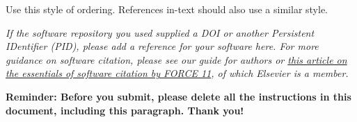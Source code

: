 \documentclass[preprint,12pt, a4paper]{elsarticle}
\begin{document}

\begin{thebibliography}{00}


\bibitem{} Use this style of ordering. References in-text should also use a similar style.

\end{thebibliography}

\textit{If the software repository you used supplied a DOI or another
Persistent IDentifier (PID), please add a reference for your software
here. For more guidance on software citation, please see our guide for
authors or \href{https://f1000research.com/articles/9-1257/v2}{this
  article on the essentials of software citation by FORCE 11}, of
which Elsevier is a member.}

\large{\textbf{Reminder: Before you submit, please delete all
the instructions in this document,
including this paragraph.
Thank you!}}
\end{document}
